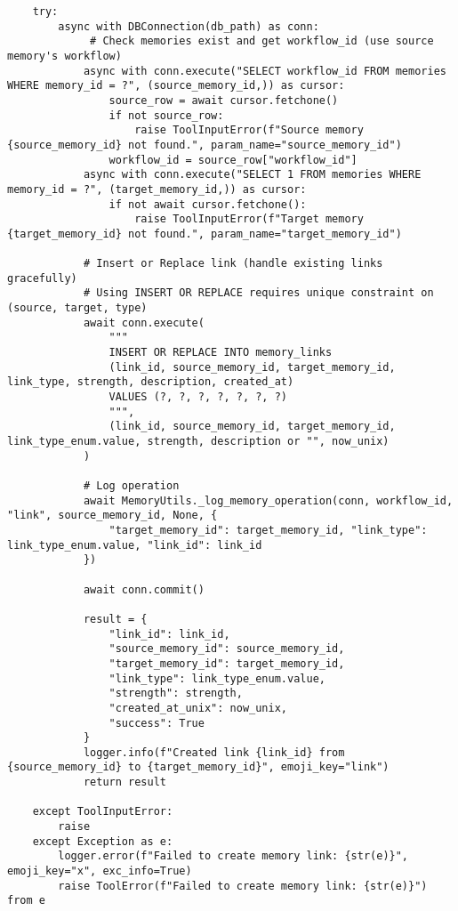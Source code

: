 \documentclass[12pt,a4paper]{article}
\begin{document}
\begin{pageablecode}
\begin{verbatim}
    try:
        async with DBConnection(db_path) as conn:
             # Check memories exist and get workflow_id (use source memory's workflow)
            async with conn.execute("SELECT workflow_id FROM memories WHERE memory_id = ?", (source_memory_id,)) as cursor:
                source_row = await cursor.fetchone()
                if not source_row: 
                    raise ToolInputError(f"Source memory {source_memory_id} not found.", param_name="source_memory_id")
                workflow_id = source_row["workflow_id"]
            async with conn.execute("SELECT 1 FROM memories WHERE memory_id = ?", (target_memory_id,)) as cursor:
                if not await cursor.fetchone(): 
                    raise ToolInputError(f"Target memory {target_memory_id} not found.", param_name="target_memory_id")

            # Insert or Replace link (handle existing links gracefully)
            # Using INSERT OR REPLACE requires unique constraint on (source, target, type)
            await conn.execute(
                """
                INSERT OR REPLACE INTO memory_links
                (link_id, source_memory_id, target_memory_id, link_type, strength, description, created_at)
                VALUES (?, ?, ?, ?, ?, ?, ?)
                """,
                (link_id, source_memory_id, target_memory_id, link_type_enum.value, strength, description or "", now_unix)
            )

            # Log operation
            await MemoryUtils._log_memory_operation(conn, workflow_id, "link", source_memory_id, None, {
                "target_memory_id": target_memory_id, "link_type": link_type_enum.value, "link_id": link_id
            })

            await conn.commit()

            result = {
                "link_id": link_id,
                "source_memory_id": source_memory_id,
                "target_memory_id": target_memory_id,
                "link_type": link_type_enum.value,
                "strength": strength,
                "created_at_unix": now_unix,
                "success": True
            }
            logger.info(f"Created link {link_id} from {source_memory_id} to {target_memory_id}", emoji_key="link")
            return result

    except ToolInputError:
        raise
    except Exception as e:
        logger.error(f"Failed to create memory link: {str(e)}", emoji_key="x", exc_info=True)
        raise ToolError(f"Failed to create memory link: {str(e)}") from e


\end{verbatim}
\end{pageablecode}
\end{document}
